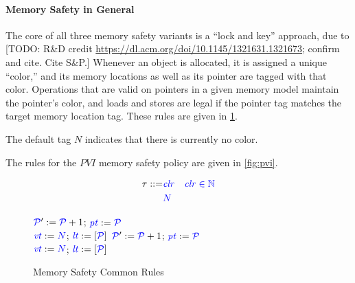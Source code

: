 \documentclass{llncs}
\begin{document}
\paragraph*{Memory Safety in General}

The core of all three memory safety variants is a ``lock and key'' approach, due to
[TODO: R\&D credit \url{https://dl.acm.org/doi/10.1145/1321631.1321673}; confirm and cite. Cite S\&P.]
Whenever an object is allocated, it is assigned a unique ``color,'' and its memory locations as well
as its pointer are tagged with that color. Operations that are valid on pointers in a given memory model
maintain the pointer's color, and  loads and stores are legal if the pointer tag matches the target memory
location tag. These rules are given in \cref{fig:memcommon}.

The default tag \(N\) indicates that there is currently no color.

The rules for the \(PVI\) memory safety policy are given in \cref{fig:pvi}.

\begin{figure}
  \color{blue}
  \begin{align*}
    \tau ::= & \color{blue} \mathit{clr} & \color{blue} \mathit{clr} \in \mathbb{N} \\
    & {\color{blue} N} \\
  \end{align*}
  
  \scriptsize

  \begin{minipage}[t]{0.25\textwidth}
    \vspace{-2.5em}
    \localtruleblock
        {\(\mathcal{\color{blue} P\mathit{}}' := \mathcal{\color{blue} P\mathit{}}+1\);
          \(\mathit{\color{blue} pt} := \mathcal{\color{blue} P\mathit{}}\)\\
          \(\mathit{\color{blue} vt} := {\color{blue} N}\);
          \(\mathit{\color{blue} lt} := \left[ \mathcal{\color{blue} P\mathit{}} \right]\)
        }
    \malloctruleblock
        {\(\mathcal{\color{blue} P\mathit{}}' := \mathcal{\color{blue} P\mathit{}}+1\);
          \(\mathit{\color{blue} pt} := \mathcal{\color{blue} P\mathit{}}\) \\
          \(\mathit{\color{blue} vt} := {\color{blue} N}\);
          \(\mathit{\color{blue} lt} := \left[ \mathcal{\color{blue} P\mathit{}} \right]\)
        }
  \end{minipage}
  \begin{minipage}[t]{0.3\textwidth}
    \vspace{-2.5em}

  \end{minipage}
  
  \caption{Memory Safety Common Rules}
  \label{fig:memcommon}
\end{figure}
\end{document}
